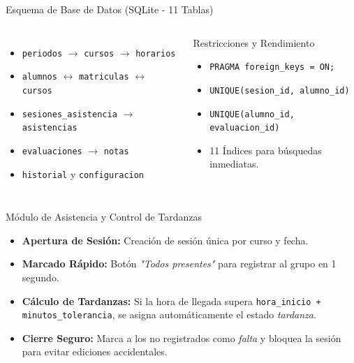\documentclass[aspectratio=169,10pt]{beamer}
\begin{document}
\begin{frame}{Esquema de Base de Datos (SQLite - 11 Tablas)}
  \begin{columns}
      \begin{itemize}
        \item \texttt{periodos} $\rightarrow$ \texttt{cursos} $\rightarrow$ \texttt{horarios}
        \item \texttt{alumnos} $\leftrightarrow$ \texttt{matriculas} $\leftrightarrow$ \texttt{cursos}
        \item \texttt{sesiones\_asistencia} $\rightarrow$ \texttt{asistencias}
        \item \texttt{evaluaciones} $\rightarrow$ \texttt{notas}
        \item \texttt{historial} y \texttt{configuracion}
      \end{itemize}
      \begin{block}{Restricciones y Rendimiento}
        \begin{itemize}
          \item \texttt{PRAGMA foreign\_keys = ON;}
          \item \texttt{UNIQUE(sesion\_id, alumno\_id)}
          \item \texttt{UNIQUE(alumno\_id, evaluacion\_id)}
          \item 11 Índices para búsquedas inmediatas.
        \end{itemize}
      \end{block}
  \end{columns}
\end{frame}

\begin{frame}{Módulo de Asistencia y Control de Tardanzas}
  \begin{itemize}
    \item \textbf{Apertura de Sesión:} Creación de sesión única por curso y fecha.
    \item \textbf{Marcado Rápido:} Botón \textit{"Todos presentes"} para registrar al grupo en 1 segundo.
    \item \textbf{Cálculo de Tardanzas:} Si la hora de llegada supera \texttt{hora\_inicio + minutos\_tolerancia}, se asigna automáticamente el estado \textit{tardanza}.
    \item \textbf{Cierre Seguro:} Marca a los no registrados como \textit{falta} y bloquea la sesión para evitar ediciones accidentales.
  \end{itemize}
\end{frame}
\end{document}
